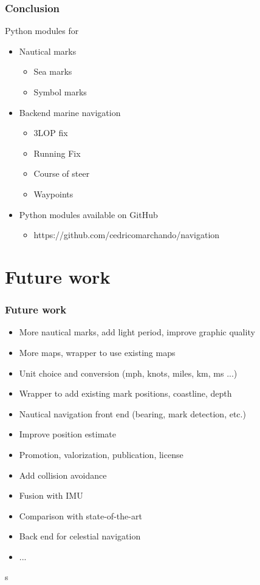\documentclass{beamer}
\begin{document}
\begin{frame}
\frametitle{Conclusion}
Python modules for 
    \begin{itemize}
        \item Nautical marks
        \begin{itemize}
            \item Sea marks
            \item Symbol marks
        \end{itemize}
        \item Backend marine navigation
        \begin{itemize}
            \item 3LOP fix
            \item Running Fix
            \item Course of steer
            \item Waypoints
        \end{itemize}
        \item Python modules available on GitHub
        \begin{itemize}
            \item https://github.com/cedricomarchando/navigation
        \end{itemize}
        
    \end{itemize}
\end{frame}

\section{Future work}

\begin{frame}
    \frametitle{Future work}
    \begin{itemize}
        \item More nautical marks, add light period, improve graphic quality
        \item More maps, wrapper to use existing maps
        \item Unit choice and conversion (mph, knots, miles, km, ms ...)
        \item Wrapper to add existing mark positions, coastline, depth
        \item Nautical navigation front end (bearing, mark detection, etc.)
        \item Improve position estimate
        \item Promotion, valorization, publication, license
        \item Add collision avoidance
        \item Fusion with IMU
        \item Comparison with state-of-the-art
        \item Back end for celestial navigation
        \item ...
    \end{itemize}s
\end{frame}
\end{document}
